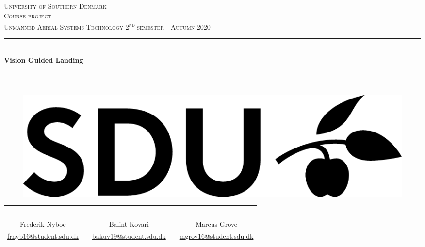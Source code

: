 \documentclass[../Head/Main.tex]{subfiles}
\begin{document}
\begin{titlepage}
\begin{center}
\textsc{\LARGE University of Southern Denmark}\\[1.25cm]

\textsc{Course project}\\[0.35cm]

\textsc{\large Unmanned Aerial Systems Technology 2\textsuperscript{nd} semester - Autumn 2020}\\[0.35cm]
\rule{\linewidth}{0.5mm}\\[0.35cm]
{ \LARGE \bfseries Vision Guided Landing\\[0.35cm]}
\rule{\linewidth}{0.5mm}\\[1cm]

\vspace{3cm}

    \begin{figure}[h!]
    \centering
    \includegraphics[scale=1]{../Figures/SDUlogo}
    \label{fig:SDUlogo}\\
    [2.5cm]
    \end{figure}

\begin{tabular}{c c c c c}
    \\
    \\
    \\
    \\
    \\
    \\    
    \cline{1-1}\cline{3-3}\cline{5-5}
    Frederik Nyboe & & Balint Kovari & & Marcus Grove \\
    \href{mailto:frnyb16@student.sdu.dk}{frnyb16@student.sdu.dk} & & \href{mailto:bakuv19@student.sdu.dk}{bakuv19@student.sdu.dk} & &
    \href{mailto:mgrov16@student.sdu.dk}{mgrov16@student.sdu.dk}
    \\
\end{tabular}	

\vfill


\end{center}
\end{titlepage}
\end{document}
